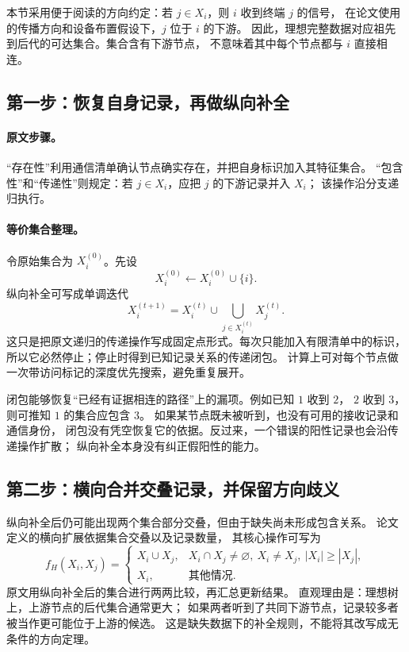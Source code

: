 本节采用便于阅读的方向约定：若 $j\in X_i$，则 $i$ 收到终端 $j$ 的信号，
在论文使用的传播方向和设备布置假设下，$j$ 位于 $i$ 的下游。
因此，理想完整数据对应祖先到后代的可达集合。集合含有下游节点，
不意味着其中每个节点都与 $i$ 直接相连。

\subsection{第一步：恢复自身记录，再做纵向补全}
\paragraph{原文步骤。}
“存在性”利用通信清单确认节点确实存在，并把自身标识加入其特征集合。
“包含性”和“传递性”则规定：若 $j\in X_i$，应把 $j$ 的下游记录并入 $X_i$；
该操作沿分支递归执行。\citep[第3.1、3.4节]{P4}

\paragraph{等价集合整理。}
令原始集合为 $X_i^{(0)}$。先设
\[
 X_i^{(0)}\leftarrow X_i^{(0)}\cup\{i\}.
\]
纵向补全可写成单调迭代
\begin{equation}\label{eq:tb-P4-closure}
 X_i^{(t+1)}
 =X_i^{(t)}\cup\bigcup_{j\in X_i^{(t)}}X_j^{(t)}.
\end{equation}
这只是把原文递归的传递操作写成固定点形式。每次只能加入有限清单中的标识，
所以它必然停止；停止时得到已知记录关系的传递闭包。
计算上可对每个节点做一次带访问标记的深度优先搜索，避免重复展开。

闭包能够恢复“已经有证据相连的路径”上的漏项。例如已知 $1$ 收到 $2$，
$2$ 收到 $3$，则可推知 $1$ 的集合应包含 $3$。
如果某节点既未被听到，也没有可用的接收记录和通信身份，
闭包没有凭空恢复它的依据。反过来，一个错误的阳性记录也会沿传递操作扩散；
纵向补全本身没有纠正假阳性的能力。

\subsection{第二步：横向合并交叠记录，并保留方向歧义}
纵向补全后仍可能出现两个集合部分交叠，但由于缺失尚未形成包含关系。
论文定义的横向扩展依据集合交叠以及记录数量，
其核心操作可写为
\begin{equation}\label{eq:tb-P4-horizontal}
 f_H(X_i,X_j)=
 \begin{cases}
 X_i\cup X_j,&X_i\cap X_j\ne\varnothing,\ X_i\ne X_j,\
                         |X_i|\ge |X_j|,\\
 X_i,&\text{其他情况}.
 \end{cases}
\end{equation}
原文用纵向补全后的集合进行两两比较，再汇总更新结果。
直观理由是：理想树上，上游节点的后代集合通常更大；
如果两者听到了共同下游节点，记录较多者被当作更可能位于上游的候选。
这是缺失数据下的补全规则，不能将其改写成无条件的方向定理。

